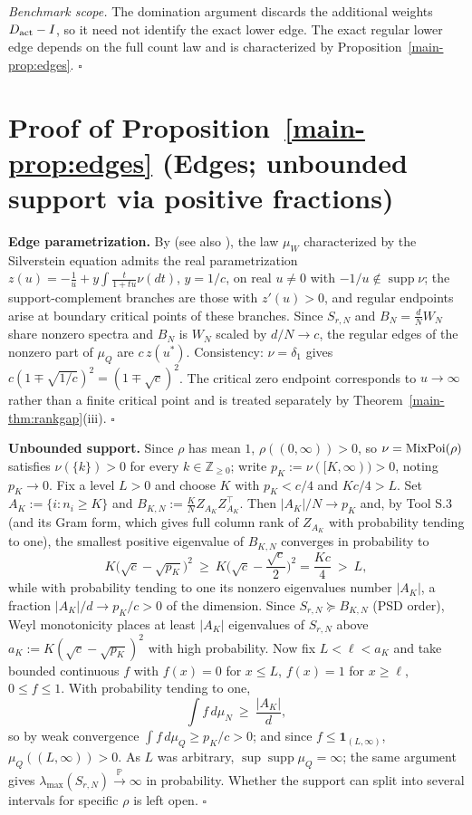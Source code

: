 \emph{Benchmark scope.} The domination argument discards the additional weights $D_{\rm act}-I$, so it need not identify the exact lower edge. The exact regular lower edge depends on the full count law and is characterized by Proposition~\ref{main-prop:edges}. $\square$

\section{Proof of Proposition~\ref{main-prop:edges} (Edges; unbounded support via positive fractions)}\label{sec:S13}

\textbf{Edge parametrization.} By \cite{silverstein1995analysis} (see also \cite[Ch.~6]{bai2010spectral}), the law $\mu_W$ characterized by the Silverstein equation admits the real parametrization $z(u)=-\frac1u+y\int\frac{t}{1+tu}\nu(dt)$, $y=1/c$, on real $u\neq0$ with $-1/u\notin\operatorname{supp}\nu$; the support-complement branches are those with $z'(u)>0$, and regular endpoints arise at boundary critical points of these branches. Since $S_{r,N}$ and $B_N=\frac dNW_N$ share nonzero spectra and $B_N$ is $W_N$ scaled by $d/N\to c$, the regular edges of the nonzero part of $\mu_Q$ are $c\,z(u^*)$. Consistency: $\nu=\delta_1$ gives $c(1\mp\sqrt{1/c})^2=(1\mp\sqrt c)^2$. The critical zero endpoint corresponds to $u\to\infty$ rather than a finite critical point and is treated separately by Theorem~\ref{main-thm:rankgap}(iii). $\square$

\textbf{Unbounded support.} Since $\rho$ has mean $1$, $\rho((0,\infty))>0$, so $\nu=\operatorname{MixPoi}(\rho)$ satisfies $\nu(\{k\})>0$ for every $k\in\mathbb Z_{\ge0}$; write $p_K:=\nu([K,\infty))>0$, noting $p_K\to0$. Fix a level $L>0$ and choose $K$ with $p_K<c/4$ and $Kc/4>L$. Set $A_K:=\{i:n_i\ge K\}$ and $B_{K,N}:=\frac KN Z_{A_K}Z_{A_K}^\top$. Then $|A_K|/N\to p_K$ and, by Tool S.3 (and its Gram form, which gives full column rank of $Z_{A_K}$ with probability tending to one), the smallest positive eigenvalue of $B_{K,N}$ converges in probability to
\[
K\big(\sqrt c-\sqrt{p_K}\big)^2\ \ge\ K\Big(\sqrt c-\frac{\sqrt c}{2}\Big)^2=\frac{Kc}{4}\ >\ L,
\]
while with probability tending to one its nonzero eigenvalues number $|A_K|$, a fraction $|A_K|/d\to p_K/c>0$ of the dimension. Since $S_{r,N}\succeq B_{K,N}$ (PSD order), Weyl monotonicity places at least $|A_K|$ eigenvalues of $S_{r,N}$ above $a_K:=K(\sqrt c-\sqrt{p_K})^2$ with high probability. Now fix $L<\ell<a_K$ and take bounded continuous $f$ with $f(x)=0$ for $x\le L$, $f(x)=1$ for $x\ge\ell$, $0\le f\le1$. With probability tending to one,
\[
\int f\,d\mu_N\ \ge\ \frac{|A_K|}{d},
\]
so by weak convergence $\int f\,d\mu_Q\ge p_K/c>0$; and since $f\le\mathbf 1_{(L,\infty)}$, $\mu_Q((L,\infty))>0$. As $L$ was arbitrary, $\sup\operatorname{supp}\mu_Q=\infty$; the same argument gives $\lambda_{\max}(S_{r,N})\xrightarrow{\mathbb P}\infty$ in probability. Whether the support can split into several intervals for specific $\rho$ is left open. $\square$

